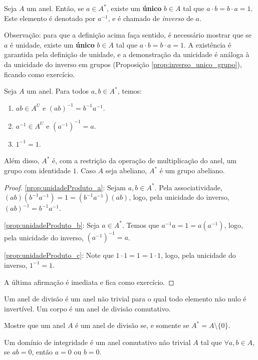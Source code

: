 \begin{definition}
    Seja $A$ um anel. Então, se $a \in A^*$, existe um \textbf{único} $b \in A$ tal que $a \cdot b = b \cdot a = 1$. Este elemento é denotado por $a^{-1}$, e é chamado de \emph{inverso} de $a$.
\end{definition}

Observação: para que a definição acima faça sentido, é necessário mostrar que se $a$ é unidade, existe um \textbf{único} $b \in A$ tal que $a \cdot b = b \cdot a = 1$. A existência é garantida pela definição de unidade, e a demonstração da unicidade é análoga à da unicidade do inverso em grupos (Proposição \ref{prop:inverso_unico_grupo}), ficando como exercício.

\begin{prop}
Seja $A$ um anel. Para todos $a, b \in A^*$, temos:
\begin{enumerate}[label=\alph*)]
    \item $ab\in A^U$ e $(ab)^{-1}=b^{-1}a^{-1}$.\label{prop:unidadeProduto_a}
    \item $a^{-1}\in A^U$ e $(a^{-1})^{-1}=a$.\label{prop:unidadeProduto_b}
    \item $1^{-1}=1$.\label{prop:unidadeProduto_c}
\end{enumerate}
Além disso, $A^*$ é, com a restrição da operação de multiplicação do anel, um grupo com identidade $1$. Caso $A$ seja abeliano, $A^*$ é um grupo abeliano.
\end{prop}
\begin{proof}
    \ref{prop:unidadeProduto_a}: Sejam $a, b \in A^*$. Pela associatividade, $(ab)(b^{-1}a^{-1})=1=(b^{-1}a^{-1})(ab)$, logo, pela unicidade do inverso, $(ab)^{-1}=b^{-1}a^{-1}$.

    \ref{prop:unidadeProduto_b}: Seja $a \in A^*$. Temos que $a^{-1}a=1=a(a^{-1})$, logo, pela unicidade do inverso, $(a^{-1})^{-1}=a$.

    \ref{prop:unidadeProduto_c}: Note que $1\cdot 1=1=1\cdot 1$, logo, pela unicidade do inverso, $1^{-1}=1$.

    A última afirmação é imediata e fica como exercício.
\end{proof}

\begin{definition}
Um anel de divisão é um anel não trivial para o qual todo elemento não nulo é invertível. Um corpo é um anel de divisão comutativo.
\end{definition}

\begin{exer}
    Mostre que um anel $A$ é um anel de divisão se, e somente se $A^*=A\setminus\{0\}$.
\end{exer}
\begin{definition}
    Um domínio de integridade é um anel comutativo não trivial $A$ tal que $\forall a, b \in A$, se $ab=0$, então $a=0$ ou $b=0$.
\end{definition}

